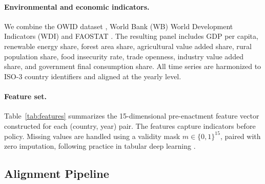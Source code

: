 \documentclass[11pt]{article}
\begin{document}
\paragraph{Environmental and economic indicators.}
We combine the OWID dataset \citep{owid-co2},  World Bank (WB) World Development Indicators (WDI) \citep{worldbank} and FAOSTAT \citep{faostat}. The resulting panel includes GDP per capita, renewable energy share, forest area share, agricultural value added share, rural population share, food insecurity rate, trade openness, industry value added share, and government final consumption share. All time series are harmonized to ISO-3 country identifiers and aligned at the yearly level.

\paragraph{Feature set.}
Table~\ref{tab:features} summarizes the 15-dimensional pre-enactment feature vector constructed for each (country, year) pair. The features capture indicators before policy. Missing values are handled using a validity mask $m \in \{0,1\}^{15}$, paired with zero imputation, following practice in tabular deep learning \citep{van2023missing}.


\begin{table}[!t]
\centering\small
\setlength{\tabcolsep}{3pt}
\caption{Pre-enactment feature set used for each (country, year) observation.}
\label{tab:features}
\end{table}



\subsection{Alignment Pipeline}
\label{sec:pipeline}
\end{document}
